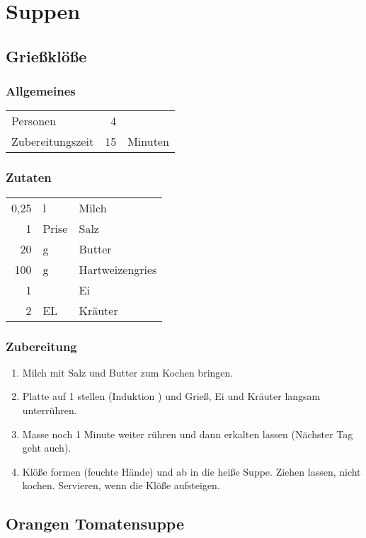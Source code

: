 \chapter{Suppen}

\section{Grießklöße}
\subsection*{Allgemeines}
\begin{tabular}{lrl}
	Personen         &                        4 &  \\
	Zubereitungszeit &                       15 & Minuten \\
\end{tabular} 

\subsection*{Zutaten}
\begin{tabular}{rll}
	0,25 & l     & Milch           \\
	   1 & Prise & Salz            \\
	  20 & g     & Butter          \\
	 100 & g     & Hartweizengries \\
	   1 &       & Ei              \\
	   2 & EL    & Kräuter
\end{tabular} 
\subsection*{Zubereitung}
\begin{enumerate}
	\item Milch mit Salz und Butter zum Kochen bringen.
	\item Platte auf 1 stellen (Induktion ) und Grieß, Ei und Kräuter langsam unterrühren.
	\item Masse noch 1 Minute weiter rühren und dann erkalten lassen (Nächster Tag geht auch).
	\item Klöße formen (feuchte Hände) und ab in die heiße Suppe. Ziehen lassen, nicht kochen. Servieren, wenn die Klöße aufsteigen.
\end{enumerate}

\section{Orangen Tomatensuppe}
